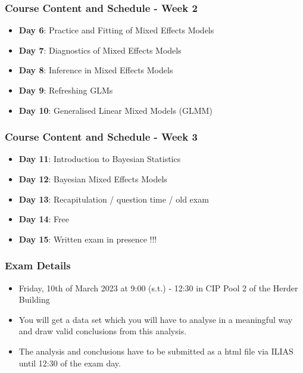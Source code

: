 \documentclass{beamer}
\begin{document}
\begin{frame}
\frametitle{Course Content and Schedule - Week 2}
\begin{itemize}
    \item \textbf{Day 6}: Practice and Fitting of Mixed Effects Models
    \item \textbf{Day 7}: Diagnostics of Mixed Effects Models
    \item \textbf{Day 8}: Inference in Mixed Effects Models
    \item \textbf{Day 9}: Refreshing GLMs
    \item \textbf{Day 10}: Generalised Linear Mixed Models (GLMM)
\end{itemize}
\end{frame}

\begin{frame}
\frametitle{Course Content and Schedule - Week 3}
\begin{itemize}
    \item \textbf{Day 11}: Introduction to Bayesian Statistics
    \item \textbf{Day 12}: Bayesian Mixed Effects Models
    \item \textbf{Day 13}: Recapitulation / question time / old exam
    \item \textbf{Day 14}: Free
    \item \textbf{Day 15}: Written exam in presence !!!
\end{itemize}
\end{frame}

\begin{frame}
\frametitle{Exam Details}
\begin{itemize}
    \item Friday, 10th of March 2023 at 9:00 (s.t.) - 12:30 in CIP Pool 2 of the Herder Building
    \item You will get a data set which you will have to analyse in a meaningful way and draw valid conclusions from this analysis.
    \item The analysis and conclusions have to be submitted as a html file via ILIAS until 12:30 of the exam day.
\end{itemize}
\vspace{2em}
\begin{center}
    \textbf{\color{red}{register for the exam latest on Wednesday 1st of March 2023}}
\end{center}
\end{frame}
\end{document}
